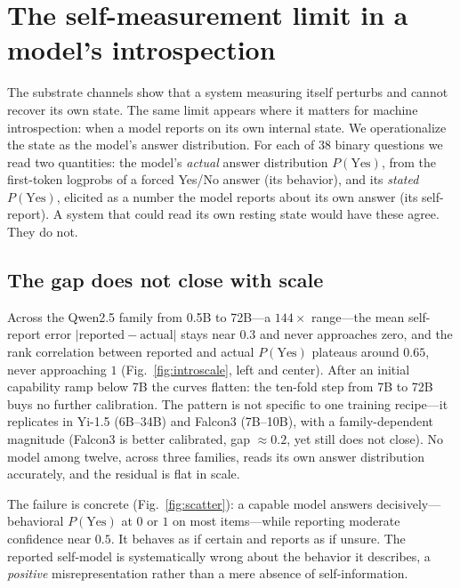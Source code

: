 
\section{The self-measurement limit in a model's introspection}
The substrate channels show that a system measuring itself perturbs and cannot recover its own state.
The same limit appears where it matters for machine introspection: when a model reports on its own
internal state. We operationalize the state as the model's answer distribution. For each of 38 binary
questions we read two quantities: the model's \emph{actual} answer distribution $P(\text{Yes})$, from the
first-token logprobs of a forced Yes/No answer (its behavior), and its \emph{stated} $P(\text{Yes})$,
elicited as a number the model reports about its own answer (its self-report). A system that could read
its own resting state would have these agree. They do not.

\subsection{The gap does not close with scale}
Across the Qwen2.5 family from 0.5B to 72B---a $144\times$ range---the mean self-report error
$|\text{reported}-\text{actual}|$ stays near $0.3$ and never approaches zero, and the rank correlation
between reported and actual $P(\text{Yes})$ plateaus around $0.65$, never approaching $1$
(Fig.~\ref{fig:introscale}, left and center). After an initial capability ramp below 7B the curves flatten:
the ten-fold step from 7B to 72B buys no further calibration. The pattern is not specific to one training
recipe---it replicates in Yi-1.5 (6B--34B) and Falcon3 (7B--10B), with a family-dependent magnitude
(Falcon3 is better calibrated, gap $\approx 0.2$, yet still does not close). No model among twelve, across
three families, reads its own answer distribution accurately, and the residual is flat in scale.

The failure is concrete (Fig.~\ref{fig:scatter}): a capable model answers decisively---behavioral
$P(\text{Yes})$ at $0$ or $1$ on most items---while reporting moderate confidence near $0.5$. It behaves as
if certain and reports as if unsure. The reported self-model is systematically wrong about the behavior it
describes, a \emph{positive} misrepresentation rather than a mere absence of self-information.

